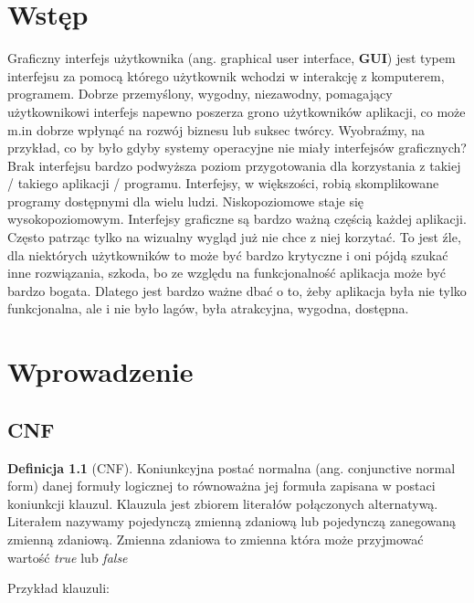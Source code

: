 \documentclass[a4paper,12pt,oneside]{book}
\theoremstyle{definition}
\newtheorem{definition}{Definicja}
\begin{document}


\tableofcontents{}

\chapter*{Wstęp}

 Graficzny interfejs użytkownika (ang. graphical user interface, \textbf{GUI}) jest typem interfejsu za pomocą którego użytkownik wchodzi w interakcję z komputerem, programem. Dobrze przemyślony, wygodny, niezawodny, pomagający użytkownikowi interfejs napewno poszerza grono użytkowników aplikacji, co może m.in dobrze wpłynąć na rozwój biznesu lub suksec twórcy. Wyobraźmy, na przykład, co by było gdyby systemy operacyjne nie miały interfejsów graficznych? Brak interfejsu bardzo podwyższa poziom przygotowania dla korzystania z takiej / takiego aplikacji / programu. Interfejsy, w większości, robią skomplikowane programy dostępnymi dla wielu ludzi. Niskopoziomowe staje się wysokopoziomowym. Interfejsy graficzne są bardzo ważną częścią każdej aplikacji. Często patrząc tylko na wizualny wygląd już nie chce z niej korzytać. To jest źle, dla niektórych użytkowników to może być bardzo krytyczne i oni pójdą szukać inne rozwiązania, szkoda, bo ze względu na funkcjonalność aplikacja może być bardzo bogata. Dlatego jest bardzo ważne dbać o to, żeby aplikacja była nie tylko funkcjonalna, ale i nie było lagów, była atrakcyjna, wygodna, dostępna.

\chapter{Wprowadzenie}

\section{CNF}

\begin{definition}[CNF]
     Koniunkcyjna postać normalna (ang. conjunctive normal form) danej formuły logicznej to równoważna jej formuła zapisana w postaci koniunkcji klauzul. Klauzula jest zbiorem literałów połączonych alternatywą. Literałem nazywamy pojedynczą zmienną zdaniową lub pojedynczą zanegowaną zmienną zdaniową. Zmienna zdaniowa to zmienna która może przyjmować wartość \textit{true} lub \textit{false} 
\end{definition}

Przykład klauzuli:
\end{document}
